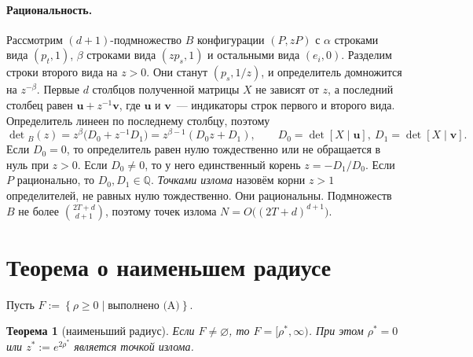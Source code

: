 \documentclass[a4paper,11pt]{article}
\theoremstyle{plain}
\newtheorem{theorem}{Теорема}[section]
\theoremstyle{definition}
\theoremstyle{remark}
\newcommand{\Q}{\mathbb{Q}}
\newcommand{\set}[1]{\left\{ #1 \right\}}
\begin{document}
\paragraph{Рациональность.}
Рассмотрим $(d+1)$-подмножество $B$ конфигурации $(P,zP)$ с $\alpha$ строками вида $(p_t,1)$, $\beta$ строками вида $(zp_s,1)$ и остальными вида $(e_i,0)$. Разделим строки второго вида на $z>0$. Они станут $(p_s,1/z)$, и определитель домножится на $z^{-\beta}$. Первые $d$ столбцов полученной матрицы $X$ не зависят от $z$, а последний столбец равен $\mathbf u+z^{-1}\mathbf v$, где $\mathbf u$ и $\mathbf v$~--- индикаторы строк первого и второго вида. Определитель линеен по последнему столбцу, поэтому
\[
    \det{}_B(z)=z^{\beta}\bigl(D_0+z^{-1}D_1\bigr)=z^{\beta-1}(D_0z+D_1),\qquad D_0=\det[X\mid\mathbf u],\ D_1=\det[X\mid\mathbf v].
\]
Если $D_0=0$, то определитель равен нулю тождественно или не обращается в нуль при $z>0$. Если $D_0\ne0$, то у него единственный корень $z=-D_1/D_0$. Если $P$ рационально, то $D_0,D_1\in\Q$. \textit{Точками излома} назовём корни $z>1$ определителей, не равных нулю тождественно. Они рациональны. Подмножеств $B$ не более $\binom{2T+d}{d+1}$, поэтому точек излома $N=O\bigl((2T+d)^{d+1}\bigr)$.

\section{Теорема о наименьшем радиусе}

Пусть $F:=\set{\rho\ge0\mid\text{выполнено (A)}}$.

\begin{theorem}[наименьший радиус]\label{thm:least}
    Если $F\ne\varnothing$, то $F=[\rho^*,\infty)$. При этом $\rho^*=0$ или $z^*:=e^{2\rho^*}$ является точкой излома.
\end{theorem}
\end{document}
